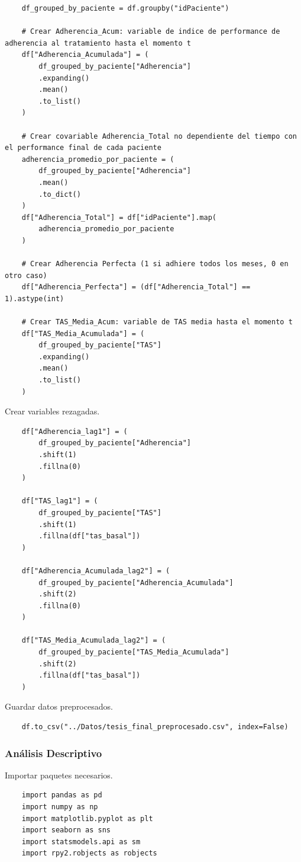 \documentclass[spanish]{article}
\numberwithin{figure}{subsection}
\numberwithin{equation}{subsection}
\numberwithin{table}{subsection}
\begin{document}
\begin{lstlisting}
	df_grouped_by_paciente = df.groupby("idPaciente")

	# Crear Adherencia_Acum: variable de indice de performance de adherencia al tratamiento hasta el momento t
	df["Adherencia_Acumulada"] = (
		df_grouped_by_paciente["Adherencia"]
		.expanding()
		.mean()
		.to_list()
	)
	
	# Crear covariable Adherencia_Total no dependiente del tiempo con el performance final de cada paciente
	adherencia_promedio_por_paciente = (
		df_grouped_by_paciente["Adherencia"]
		.mean()
		.to_dict()
	)
	df["Adherencia_Total"] = df["idPaciente"].map(
		adherencia_promedio_por_paciente
	)
	
	# Crear Adherencia Perfecta (1 si adhiere todos los meses, 0 en otro caso)
	df["Adherencia_Perfecta"] = (df["Adherencia_Total"] == 1).astype(int)
	
	# Crear TAS_Media_Acum: variable de TAS media hasta el momento t
	df["TAS_Media_Acumulada"] = (
		df_grouped_by_paciente["TAS"]
		.expanding()
		.mean()
		.to_list()
	)
\end{lstlisting}

Crear variables rezagadas.

\begin{lstlisting}
	df["Adherencia_lag1"] = (
		df_grouped_by_paciente["Adherencia"]
		.shift(1)
		.fillna(0)
	)
	
	df["TAS_lag1"] = (
		df_grouped_by_paciente["TAS"]
		.shift(1)
		.fillna(df["tas_basal"])
	)
	
	df["Adherencia_Acumulada_lag2"] = (
		df_grouped_by_paciente["Adherencia_Acumulada"]
		.shift(2)
		.fillna(0)
	)
	
	df["TAS_Media_Acumulada_lag2"] = (
		df_grouped_by_paciente["TAS_Media_Acumulada"]
		.shift(2)
		.fillna(df["tas_basal"])
	)
\end{lstlisting}

Guardar datos preprocesados.

\begin{lstlisting}
	df.to_csv("../Datos/tesis_final_preprocesado.csv", index=False)
\end{lstlisting}

\subsubsection{Análisis Descriptivo}

Importar paquetes necesarios.

\begin{lstlisting}
	import pandas as pd
	import numpy as np
	import matplotlib.pyplot as plt
	import seaborn as sns
	import statsmodels.api as sm
	import rpy2.robjects as robjects
\end{lstlisting}
\end{document}
